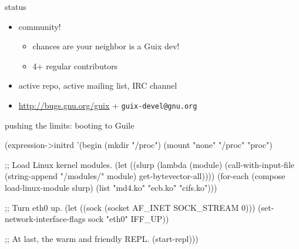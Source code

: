 \documentclass{beamer}
\begin{document}
\begin{frame}{status}
  \begin{itemize}
    \item{community!
        \begin{itemize}
          \item chances are your neighbor is a Guix dev!
          \item<2-> 4+ regular contributors
        \end{itemize}}
    \item<3-> active repo, active mailing list, IRC channel
    \item<3-> \url{http://bugs.gnu.org/guix} + \texttt{guix-devel@gnu.org}
  \end{itemize}
\end{frame}

\begin{frame}[fragile]{pushing the limits: booting to Guile}
  \vspace{-0.7cm}
  \begin{semiverbatim}
\small{
(\alert{expression->initrd}
 '(begin
    (mkdir "/proc")
    (mount "none" "/proc" "proc")

    ;; Load Linux kernel modules.
    (let ((slurp (lambda (module)
                   (call-with-input-file
                       (string-append "/modules/" module)
                     get-bytevector-all))))
      (for-each (compose load-linux-module slurp)
                (list "md4.ko" "ecb.ko" "cifs.ko")))

    ;; Turn eth0 up.
    (let ((sock (socket AF_INET SOCK_STREAM 0)))
      (set-network-interface-flags sock "eth0" IFF_UP))

    ;; At last, the warm and friendly REPL.
    (start-repl)))
}
  \end{semiverbatim}

\end{frame}
\end{document}
